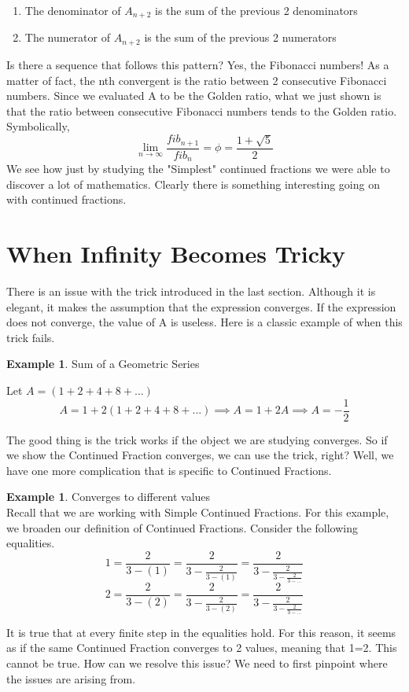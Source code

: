 \documentclass[psamsfonts]{amsart}
\theoremstyle{definition}
\newtheorem{exmp}[thm]{Example}
\theoremstyle{remark}
\numberwithin{equation}{section}
\begin{document}
\begin{enumerate}
    \item The denominator of  $A_{n+2}$ is the sum of the previous 2 denominators 
    \item The numerator of  $A_{n+2}$  is the sum of the previous 2 numerators
\end{enumerate}
Is there a sequence that follows this pattern? Yes, the Fibonacci numbers! As a matter of fact, the nth convergent is the ratio between 2 consecutive Fibonacci numbers. Since we evaluated A to be the Golden ratio, what we just shown is that the ratio between consecutive Fibonacci numbers tends to the Golden ratio. Symbolically,
$$ \lim_{n \to \infty} \dfrac{fib_{n+1}}{fib_{n}} = \phi = \dfrac{1+\sqrt{5}}{2}$$
We see how just by studying the "Simplest" continued fractions we were able to discover a lot of mathematics. Clearly there is something interesting going on with continued fractions.

\section{When Infinity Becomes Tricky}

There is an issue with the trick introduced in the last section. Although it is elegant, it makes the assumption that the expression converges. If the expression does not converge, the value of A is useless. Here is a classic example of when this trick fails.

\begin{exmp} Sum of a Geometric Series

Let $A = (1 + 2 + 4 +8+...)$ \\
$$A = 1+2(1 + 2 + 4 +8+...) \implies A=1+2A \implies A= - \frac{1}{2}$$
    
\end{exmp}

The good thing is the trick works if the object we are studying converges. So if we show the Continued Fraction converges, we can use the trick, right? Well, we have one more complication that is specific to Continued Fractions.

\begin{exmp} Converges to different values\\
Recall that we are working with Simple Continued Fractions. For this example, we broaden our definition of Continued Fractions. Consider the following equalities.\\
$$1 = \frac{2}{3-(1)} = \frac{2}{3-\frac{2}{3-(1)}} = \frac{2}{3-\frac{2}{3-\frac{2}{3-...}}}$$
$$2 = \frac{2}{3-(2)} = \frac{2}{3-\frac{2}{3-(2)}} = \frac{2}{3-\frac{2}{3-\frac{2}{3-...}}}$$
\end{exmp}
It is true that at every finite step in the equalities hold. For this reason, it seems as if the same Continued Fraction converges to 2 values, meaning that 1=2. This cannot be true. How can we resolve this issue? We need to first pinpoint where the issues are arising from.
\end{document}
